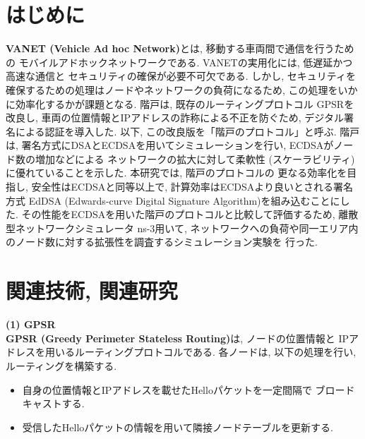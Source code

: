 \documentclass[a4j,9pt,twocolumn]{jsarticle}
\begin{document}
\pagestyle{empty} %

\section{はじめに}
\textbf{VANET (Vehicle Ad hoc Network)}とは, 移動する車両間で通信を行うための
モバイルアドホックネットワークである. VANETの実用化には, 低遅延かつ高速な通信と
セキュリティの確保が必要不可欠である. しかし, セキュリティを確保するための処理はノードやネットワークの負荷になるため, 
この処理をいかに効率化するかが課題となる. 階戸\cite{shinato}は, 既存のルーティングプロトコル
GPSRを改良し, 車両の位置情報とIPアドレスの詐称による不正を防ぐため, 
デジタル署名による認証を導入した. 以下, この改良版を「階戸のプロトコル」と呼ぶ. 
階戸は, 署名方式にDSAとECDSAを用いてシミュレーションを行い, ECDSAがノード数の増加などによる
ネットワークの拡大に対して柔軟性 (スケーラビリティ)に優れていることを示した. 本研究では, 階戸のプロトコルの
更なる効率化を目指し, 安全性はECDSAと同等以上で, 計算効率はECDSAより良いとされる署名方式
EdDSA (Edwards-curve Digital Signature Algorithm)を組み込むことにした.  
その性能をECDSAを用いた階戸のプロトコルと比較して評価するため, 離散型ネットワークシミュレータ ns-3用いて, 
ネットワークへの負荷や同一エリア内のノード数に対する拡張性を調査するシミュレーション実験を
行った. 
\section{関連技術, 関連研究}
\noindent \textbf{(1) GPSR}\\
\indent \textbf{GPSR (Greedy Perimeter Stateless Routing)}\cite{gpsr}は, ノードの位置情報と
IPアドレスを用いるルーティングプロトコルである. 各ノードは, 以下の処理を行い, 
ルーティングを構築する. 
\begin{itemize}
\item 自身の位置情報とIPアドレスを載せたHelloパケットを一定間隔で
ブロードキャストする.
\item 受信したHelloパケットの情報を用いて隣接ノードテーブルを更新する.
\end{itemize}
\end{document}
